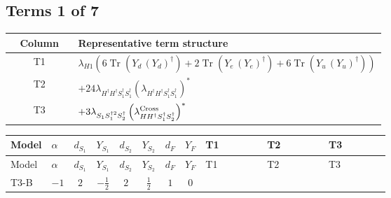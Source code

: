 \documentclass[8pt]{article}
\begin{document}
\begin{landscape}
\subsection*{Terms 1 of 7}
\begin{center}
\begin{tabular}{@{}c >{\raggedright\arraybackslash}p{0.82\linewidth}@{}}
\toprule
Column & Representative term structure \\
\midrule
T1 & \(\displaystyle {\lambda_{H1}} (6 \operatorname{Tr}\!\left({Y_d}\,\left({Y_d}\right)^{\dagger}\right)+2 \operatorname{Tr}\!\left({Y_e}\,\left({Y_e}\right)^{\dagger}\right)+6 \operatorname{Tr}\!\left({Y_u}\,\left({Y_u}\right)^{\dagger}\right))\) \\
\midrule
T2 & \(\displaystyle +24 {\lambda_{H^\dagger H^\dagger S_1^\dagger S_1^\dagger}} \left({\lambda_{H^\dagger H^\dagger S_1^\dagger S_1^\dagger}}\right)^{*}\) \\
\midrule
T3 & \(\displaystyle +3 {\lambda_{S_1 S_1^{\dagger 2}S_2^\dagger}} \left({\lambda_{H H^\dagger S_1^\dagger S_2^\dagger}^{\rm Cross}}\right)^{*}\) \\
\midrule
\bottomrule
\end{tabular}
\end{center}
\smallskip
\tiny
\begin{longtable}{@{}llcccccc >{\raggedright\arraybackslash}p{0.21\linewidth} >{\raggedright\arraybackslash}p{0.21\linewidth} >{\raggedright\arraybackslash}p{0.21\linewidth}@{}}
\toprule
Model & $\alpha$ & $d_{S_1}$ & $Y_{S_1}$ & $d_{S_2}$ & $Y_{S_2}$ & $d_F$ & $Y_F$ & T1 & T2 & T3 \\
\midrule
\endfirsthead
\toprule
Model & $\alpha$ & $d_{S_1}$ & $Y_{S_1}$ & $d_{S_2}$ & $Y_{S_2}$ & $d_F$ & $Y_F$ & T1 & T2 & T3 \\
\midrule
\endhead
T3-B & $-1$ & $2$ & $-\frac{1}{2}$ & $2$ & $\frac{1}{2}$ & $1$ & $0$ & \scriptsize\adjustbox{max width=\linewidth}{$\begin{gathered} {\lambda_{H1}} (6 \operatorname{Tr}\!\left({Y_d}\,\left({Y_d}\right)^{\dagger}\right)+2 \operatorname{Tr}\!\left({Y_e}\,\left({Y_e}\right)^{\dagger}\right)+6 \operatorname{Tr}\!\left({Y_u}\,\left({Y_u}\right)^{\dagger}\right))\end{gathered}$} & \scriptsize\adjustbox{max width=\linewidth}{$\begin{gathered} +24 {\lambda_{H^\dagger H^\dagger S_1^\dagger S_1^\dagger}} \left({\lambda_{H^\dagger H^\dagger S_1^\dagger S_1^\dagger}}\right)^{*}\end{gathered}$} & \scriptsize\adjustbox{max width=\linewidth}{$\begin{gathered} +3 {\lambda_{S_1 S_1^{\dagger 2}S_2^\dagger}} \left({\lambda_{H H^\dagger S_1^\dagger S_2^\dagger}^{\rm Cross}}\right)^{*}\end{gathered}$} \\

\end{longtable}
\end{landscape}
\end{document}
